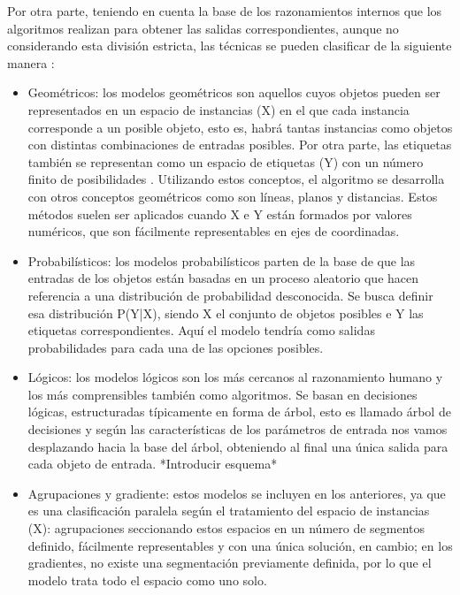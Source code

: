 \par Por otra parte, teniendo en cuenta la base de los razonamientos internos que los algoritmos realizan para obtener las salidas correspondientes, aunque no considerando esta división estricta, las técnicas se pueden clasificar de la siguiente manera \cite{MLFlach}:
\begin{itemize}
	\item Geométricos: los modelos geométricos son aquellos cuyos objetos pueden ser representados en un espacio de instancias (X) en el que cada instancia corresponde a un posible objeto, esto es, habrá tantas instancias como objetos con distintas combinaciones de entradas posibles. Por otra parte, las etiquetas también se representan como un espacio de etiquetas (Y) con un número finito de posibilidades \citep{MLPref}. Utilizando estos conceptos, el algoritmo se desarrolla con otros conceptos geométricos como son líneas, planos y distancias. Estos métodos suelen ser aplicados cuando X e Y están formados por valores numéricos, que son fácilmente representables en ejes de coordinadas.
	\item Probabilísticos: los modelos probabilísticos parten de la base de que las entradas de los objetos están basadas en un proceso aleatorio que hacen referencia a una distribución de probabilidad desconocida. Se busca definir esa distribución P(Y|X), siendo X el conjunto de objetos posibles e Y las etiquetas correspondientes. Aquí el modelo tendría como salidas probabilidades para cada una de las opciones posibles. 
	\item Lógicos: los modelos lógicos son los más cercanos al razonamiento humano y los más comprensibles también como algoritmos. Se basan en decisiones lógicas, estructuradas típicamente en forma de árbol, esto es llamado árbol de decisiones y según las características de los parámetros de entrada nos vamos desplazando hacia la base del árbol, obteniendo al final una única salida para cada objeto de entrada. *Introducir esquema*
	\item Agrupaciones y gradiente: estos modelos se incluyen en los anteriores, ya que es una clasificación paralela según el tratamiento del espacio de instancias (X): agrupaciones seccionando estos espacios en un número de segmentos definido, fácilmente representables y con una única solución, en cambio; en los gradientes, no existe una segmentación previamente definida, por lo que el modelo trata todo el espacio como uno solo. 
\end{itemize}

